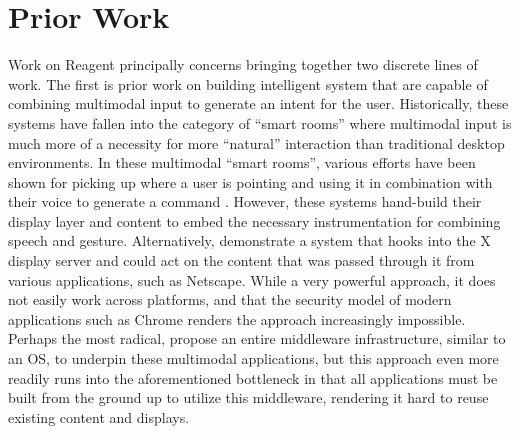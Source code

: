 \section{Prior Work}

Work on Reagent principally concerns bringing together two discrete lines
of work. The first is prior work on building intelligent system that are
capable of combining multimodal input to generate an intent for the user.
Historically, these systems have fallen into the category of ``smart rooms''
where multimodal input is much more of a necessity for more ``natural''
interaction than traditional desktop environments. In these multimodal
``smart rooms'', various efforts have been shown for picking up
where a user is pointing and using it in combination with
their voice to generate a command
\cite{bolt_put-that-there:_1980,carbini_wizard_2006,langner_multiple_2019,farrell_symbiotic_2016,kephart_embodied_2019}.
However, these systems hand-build their display layer and
content to embed the necessary instrumentation for combining speech
and gesture. Alternatively, \cite{coen_sodabot:_1994,brooks_intelligent_1997} demonstrate a system that
hooks into the X display server and could act on the content that was passed through
it from various applications, such as Netscape. While a very powerful approach, it
does not easily work across platforms, and that the security model of modern
applications such as Chrome renders the approach
increasingly impossible. Perhaps the most radical, \cite{roman_middleware_2002} propose an entire middleware infrastructure, similar to an OS,
to underpin these multimodal applications, but this approach
even more readily runs into the aforementioned bottleneck
in that all applications must be built from the ground up to 
utilize this middleware, rendering it hard to reuse existing
content and displays.


